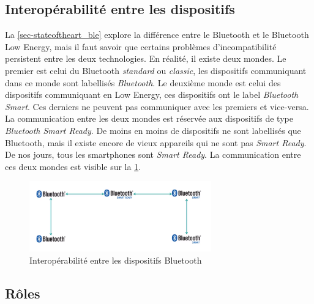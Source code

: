 \subsection{Interopérabilité entre les dispositifs}

La \cref{sec-stateoftheart_ble} explore la différence entre le Bluetooth et le Bluetooth Low Energy, mais il faut savoir que certains problèmes d'incompatibilité persistent entre les deux technologies. En réalité, il existe deux mondes. Le premier est celui du Bluetooth \textit{standard} ou \textit{classic}, les dispositifs communiquant dans ce monde sont labellisés \textit{Bluetooth}. Le deuxième monde est celui des dispositifs communiquant en Low Energy, ces dispositifs ont le label \textit{Bluetooth Smart}. Ces derniers ne peuvent pas communiquer avec les premiers et vice-versa. La communication entre les deux mondes est réservée aux dispositifs de type \textit{Bluetooth Smart Ready}. De moins en moins de dispositifs ne sont labellisés que Bluetooth, mais il existe encore de vieux appareils qui ne sont pas \textit{Smart Ready}. De nos jours, tous les smartphones sont \textit{Smart Ready}. La communication entre ces deux mondes est visible sur la \cref{fig-bluetooth_interoperabilty}.



\begin{figure}[ht!]
    \centering
    \includegraphics[width=0.7\textwidth]{Figures/Protocols/Bluetooth/bluetooth_interoperabilty.PNG}
    \caption{Interopérabilité entre les dispositifs Bluetooth}
    \label{fig-bluetooth_interoperabilty}
\end{figure}


\subsection{Rôles}
\label{sec-protocol_ble_roles}


